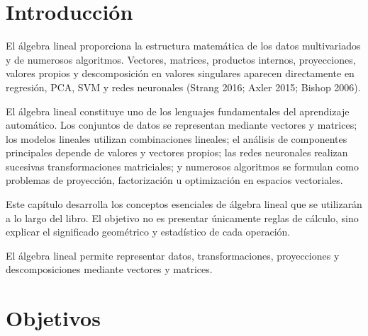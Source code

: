 \documentclass[
  spanish,
  10.5pt,
  letterpaper,
  DIV=11,
  numbers=noendperiod,
  oneside,
  open=any]{scrreprt}
\theoremstyle{definition}
\theoremstyle{definition}
\theoremstyle{plain}
\theoremstyle{remark}
\begin{document}
\section*{Introducción}\label{introducciuxf3n-2}


El álgebra lineal proporciona la estructura matemática de los datos
multivariados y de numerosos algoritmos. Vectores,
matrices, productos internos, proyecciones, valores propios y
descomposición en valores
singulares aparecen
directamente en regresión, PCA, SVM y redes neuronales (Strang 2016;
Axler 2015; Bishop 2006).

El álgebra lineal constituye uno de los lenguajes fundamentales del
aprendizaje automático. Los conjuntos de datos se representan mediante
vectores y matrices; los modelos lineales utilizan combinaciones
lineales; el análisis de componentes principales depende de valores y
vectores propios; las redes neuronales realizan sucesivas
transformaciones matriciales; y numerosos algoritmos se formulan como
problemas de proyección, factorización u optimización en espacios
vectoriales.

Este capítulo desarrolla los conceptos esenciales de álgebra lineal que
se utilizarán a lo largo del libro. El objetivo no es presentar
únicamente reglas de cálculo, sino explicar el significado geométrico y
estadístico de cada operación.

\begin{tcolorbox}[enhanced jigsaw, arc=.35mm, bottomrule=.15mm, bottomtitle=1mm, breakable, colback=white, colbacktitle=quarto-callout-important-color!10!white, colframe=quarto-callout-important-color-frame, coltitle=black, left=2mm, leftrule=.75mm, opacityback=0, opacitybacktitle=0.6, rightrule=.15mm, title=\textcolor{quarto-callout-important-color}{\faExclamation}\hspace{0.5em}{Idea central}, titlerule=0mm, toprule=.15mm, toptitle=1mm]

El álgebra lineal permite representar datos, transformaciones,
proyecciones y descomposiciones mediante vectores y matrices.

\end{tcolorbox}

\section*{Objetivos}\label{objetivos-1}
\end{document}
